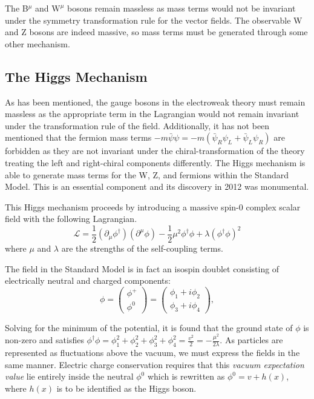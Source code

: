The B$^{\mu}$ and $\bm{\mathrm{W}}^{\mu}$ bosons remain massless as mass terms would not be invariant under the symmetry transformation rule for the vector fields. The observable W and Z bosons are indeed massive, so mass terms must be generated through some other mechanism.

\subsection{The Higgs Mechanism}

As has been mentioned, the gauge bosons in the electroweak theory must remain massless as the appropriate term in the Lagrangian would not remain invariant under the transformation rule of the field. Additionally, it has not been mentioned that the fermion mass terms $-m\bar{\psi}\psi = -m( \bar{\psi}_{R} \psi_{L} + \bar{\psi}_{L}\psi_{R})$ are forbidden as they are not invariant under the chiral-transformation of the theory treating the left and right-chiral components differently. The Higgs mechanism is able to generate mass terms for the W, Z, and fermions within the Standard Model. This is an essential component and its discovery in 2012 was monumental. \cite{higgsdisc}

This Higgs mechanism proceeds by introducing a massive spin-0 complex scalar field with the following Lagrangian.
\begin{equation}
\mathcal{L} = \frac{1}{2} (\partial_{\mu}\phi^{\dagger})(\partial^{\mu}\phi) - \frac{1}{2}\mu^{2} \phi^{\dagger}\phi + \lambda(\phi^{\dagger}\phi)^{2}
\end{equation}
where $\mu$ and $\lambda$ are the strengths of the self-coupling terms.

The field in the Standard Model is in fact an isospin doublet consisting of electrically neutral and charged components:
\begin{equation}
\phi = \begin{pmatrix} \phi^{+} \\ \phi^{0} \end{pmatrix} = \begin{pmatrix} \phi_{1} + i\phi_{2} \\  \phi_{3} + i\phi_{4} \end{pmatrix},
\end{equation}

Solving for the minimum of the potential, it is found that the ground state of $\phi$ is non-zero and satisfies $\phi^{\dagger}\phi = \phi_{1}^{2} + \phi_{2}^{2} + \phi_{3}^{2}  + \phi_{4}^{2} = \frac{v^{2}}{2} = - \frac{\mu^{2}}{2\lambda}$. As particles are represented as fluctuations above the vacuum, we must express the fields in the same manner. Electric charge conservation requires that this \textit{vacuum expectation value} lie entirely inside the neutral $\phi^{0}$ which is rewritten as $\phi^{0} = v + h(x)$, where $h(x)$ is to be identified as the Higgs boson.

